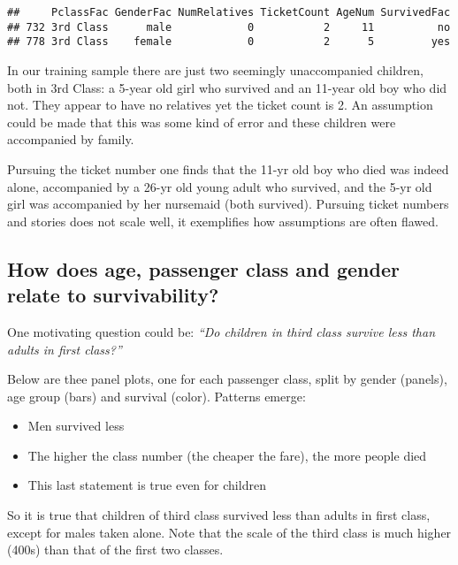 \documentclass[]{article}
\providecommand{\tightlist}{%
  \setlength{\itemsep}{0pt}\setlength{\parskip}{0pt}}
\begin{document}
\begin{verbatim}
##     PclassFac GenderFac NumRelatives TicketCount AgeNum SurvivedFac
## 732 3rd Class      male            0           2     11          no
## 778 3rd Class    female            0           2      5         yes
\end{verbatim}

In our training sample there are just two seemingly unaccompanied
children, both in 3rd Class: a 5-year old girl who survived and an
11-year old boy who did not. They appear to have no relatives yet the
ticket count is 2. An assumption could be made that this was some kind
of error and these children were accompanied by family.

Pursuing the ticket number one finds that the 11-yr old boy who died was
indeed alone, accompanied by a 26-yr old young adult who survived, and
the 5-yr old girl was accompanied by her nursemaid (both survived).
Pursuing ticket numbers and stories does not scale well, it exemplifies
how assumptions are often flawed.

\subsection{How does age, passenger class and gender relate to
survivability?}\label{how-does-age-passenger-class-and-gender-relate-to-survivability}

One motivating question could be: \emph{``Do children in third class
survive less than adults in first class?''}

Below are thee panel plots, one for each passenger class, split by
gender (panels), age group (bars) and survival (color). Patterns emerge:

\begin{itemize}
\tightlist
\item
  Men survived less
\item
  The higher the class number (the cheaper the fare), the more people
  died
\item
  This last statement is true even for children
\end{itemize}

So it is true that children of third class survived less than adults in
first class, except for males taken alone. Note that the scale of the
third class is much higher (400s) than that of the first two classes.
\end{document}
